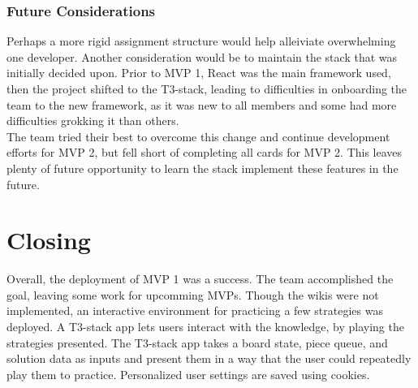 \documentclass[english,course]{lecture}
\begin{document}
\subsubsection*{Future Considerations}
Perhaps a more rigid assignment structure would help alleiviate overwhelming one developer. Another consideration would be to maintain the stack that was initially decided upon. Prior to MVP 1, React was the main framework used, then the project shifted to the T3-stack, leading to difficulties in onboarding the team to the new framework, as it was new to all members and some had more difficulties grokking it than others.
%
\\The team tried their best to overcome this change and continue development efforts for MVP 2, but fell short of completing all cards for MVP 2. This leaves plenty of future opportunity to learn the stack implement these features in the future.
%
\section{Closing}
Overall, the deployment of MVP 1 was a success. The team accomplished the goal, leaving some work for upcomming MVPs. Though the wikis were not implemented, an interactive environment for practicing a few strategies was deployed. A T3-stack app lets users interact with the knowledge, by playing the strategies presented. The T3-stack app takes a board state, piece queue, and solution data as inputs and present them in a way that the user could repeatedly play them to practice. Personalized user settings are saved using cookies.
%
\end{document}

